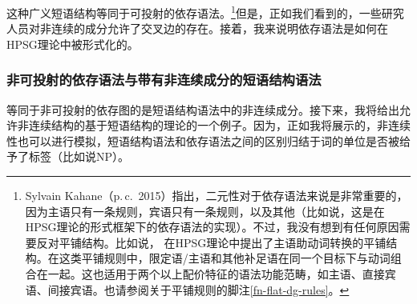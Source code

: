 这种广义短语结构等同于可投射的依存语法。\footnote{\label{fn-dg-binary-branching}%
Sylvain Kahane（p.\,c.\, 2015）指出，二元性对于依存语法来说是非常重要的，因为主语只有一条规则，宾语只有一条规则，以及其他（比如说\citealp{Kahane2009a}，这是在HPSG理论的形式框架下的依存语法的实现）。不过，我没有想到有任何原因需要反对平铺结构。比如说， \citet[]{GSag2000a-u}在HPSG理论中提出了主语助动词转换的平铺结构。在这类平铺规则中，限定语/主语和其他补足语在同一个目标下与动词组合在一起。这也适用于两个以上配价特征的语法功能范畴，如主语、直接宾语、间接宾语。也请参阅关于平铺规则的脚注\ref{fn-flat-dg-rules}。
}但是，正如我们看到的，一些研究人员对非连续的成分允许了交叉边的存在。接着，我来说明依存语法是如何在HPSG理论中被形式化的。

\subsubsection{非可投射的依存语法与带有非连续成分的短语结构语法}
\label{sec-discontinuous-constituents-HPSG}

等同于非可投射的依存图的是短语结构语法中的非连续成分。接下来，我将给出允许非连续结构的基于短语结构的理论的一个例子。因为，正如我将展示的，非连续性也可以进行模拟，短语结构语法和依存语法之间的区别归结于词的单位是否被给予了标签（比如说NP）。

